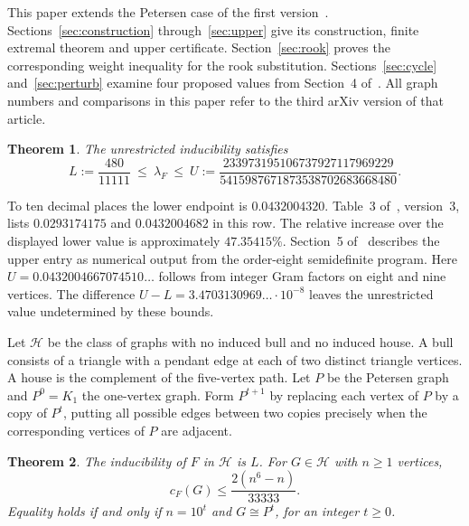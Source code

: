 \documentclass[11pt,a4paper]{article}
\newtheorem{theorem}{Theorem}
\newcommand{\BH}{\mathcal H}
\begin{document}
This paper extends the Petersen case of the first version~\cite{first}.
Sections~\ref{sec:construction} through~\ref{sec:upper} give its construction,
finite extremal theorem and upper certificate. Section~\ref{sec:rook}
proves the corresponding weight inequality for the rook substitution.
Sections~\ref{sec:cycle} and~\ref{sec:perturb} examine four proposed
values from Section~4 of~\cite{six}. All graph numbers and comparisons
in this paper refer to the third arXiv version of that article.

\begin{theorem}\label{th:global}
The unrestricted inducibility satisfies
\begin{equation}\label{eq:interval}
 L:=\frac{480}{11111}
 \ \le\ \lambda_F\ \le\
 U:=\frac{233973195106737927117969229}{5415987671873538702683668480}.
\end{equation}
\end{theorem}

To ten decimal places the lower endpoint is \(0.0432004320\).
Table~3 of~\cite{six}, version~3, lists \(0.0293174175\) and \(0.0432004682\) in this row. The relative increase over the displayed lower value is approximately \(47.35415\%\). Section~5 of~\cite{six} describes the upper entry as numerical output from the order-eight semidefinite program. Here \(U=0.0432004667074510\ldots\) follows from integer Gram factors on eight and nine vertices. The difference \(U-L=3.4703130969\ldots\cdot10^{-8}\) leaves the unrestricted value undetermined by these bounds.

Let \(\BH\) be the class of graphs with no induced bull and no induced house. A bull consists of a triangle with a pendant edge at each of two distinct triangle vertices. A house is the complement of the five-vertex path. Let \(P\) be the Petersen graph and \(P^0=K_1\) the one-vertex graph. Form \(P^{t+1}\) by replacing each vertex of \(P\) by a copy of \(P^t\), putting all possible edges between two copies precisely when the corresponding vertices of \(P\) are adjacent.

\begin{theorem}\label{th:finite}
The inducibility of \(F\) in \(\BH\) is \(L\). For \(G\in\BH\) with \(n\ge1\) vertices,
\begin{equation}\label{eq:finite}
 c_F(G)\le \frac{2(n^6-n)}{33333}.
\end{equation}
Equality holds if and only if \(n=10^t\) and \(G\cong P^t\), for an integer \(t\ge0\).
\end{theorem}
\end{document}
